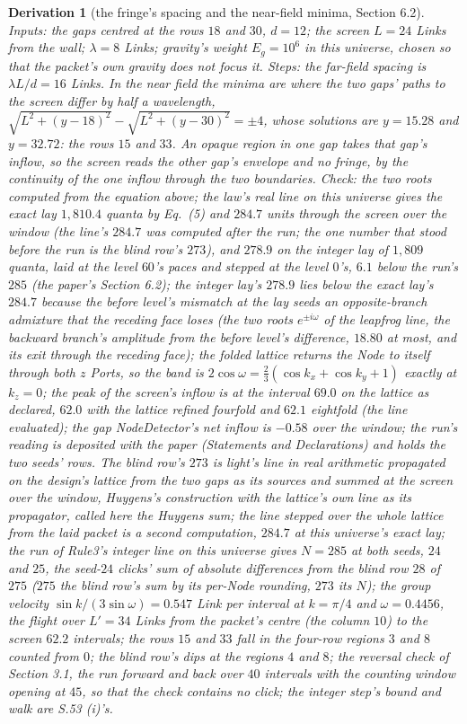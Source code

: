 \documentclass[pdflatex,sn-mathphys-num]{sn-jnl}
\theoremstyle{thmstyleone}
\newtheorem{derivation}{Derivation}
\begin{document}
\begin{derivation}[the fringe's spacing and the near-field minima, Section 6.2]
\emph{Inputs:} the gaps centred at the rows $18$ and $30$, $d = 12$; the screen $L = 24$ Links from the wall; $\lambda = 8$ Links; gravity's weight $E_g = 10^6$ in this universe, chosen so that the packet's own gravity does not focus it. \emph{Steps:} the far-field spacing is $\lambda L / d = 16$ Links. In the near field the minima are where the two gaps' paths to the screen differ by half a wavelength, $\sqrt{L^2 + (y - 18)^2} - \sqrt{L^2 + (y - 30)^2} = \pm 4$, whose solutions are $y = 15.28$ and $y = 32.72$: the rows $15$ and $33$. An opaque region in one gap takes that gap's inflow, so the screen reads the other gap's envelope and no fringe, by the continuity of the one inflow through the two boundaries. \emph{Check:} the two roots computed from the equation above; the law's real line on this universe gives the exact lay $1{,}810.4$ quanta by Eq.~(5) and $284.7$ units through the screen over the window (the line's $284.7$ was computed after the run; the one number that stood before the run is the blind row's $273$), and $278.9$ on the integer lay of $1{,}809$ quanta, laid at the level $60$'s paces and stepped at the level $0$'s, $6.1$ below the run's $285$ (the paper's Section 6.2); the integer lay's $278.9$ lies below the exact lay's $284.7$ because the before level's mismatch at the lay seeds an opposite-branch admixture that the receding face loses (the two roots $e^{\pm i\omega}$ of the leapfrog line, the backward branch's amplitude from the before level's difference, $18.80$ at most, and its exit through the receding face); the folded lattice returns the Node to itself through both $z$ Ports, so the band is $2\cos\omega = \tfrac23(\cos k_x + \cos k_y + 1)$ exactly at $k_z = 0$; the peak of the screen's inflow is at the interval $69.0$ on the lattice as declared, $62.0$ with the lattice refined fourfold and $62.1$ eightfold (the line evaluated); the gap NodeDetector's net inflow is $-0.58$ over the window; the run's reading is deposited with the paper (Statements and Declarations) and holds the two seeds' rows. The blind row's $273$ is light's line in real arithmetic propagated on the design's lattice from the two gaps as its sources and summed at the screen over the window, Huygens's construction with the lattice's own line as its propagator, called here the Huygens sum; the line stepped over the whole lattice from the laid packet is a second computation, $284.7$ at this universe's exact lay; the run of Rule3's integer line on this universe gives $N = 285$ at both seeds, $24$ and $25$, the seed-$24$ clicks' sum of absolute differences from the blind row $28$ of $275$ ($275$ the blind row's sum by its per-Node rounding, $273$ its $N$); the group velocity $\sin k / (3\sin\omega) = 0.547$ Link per interval at $k = \pi / 4$ and $\omega = 0.4456$, the flight over $L' = 34$ Links from the packet's centre (the column $10$) to the screen $62.2$ intervals; the rows $15$ and $33$ fall in the four-row regions $3$ and $8$ counted from $0$; the blind row's dips at the regions $4$ and $8$; the reversal check of Section 3.1, the run forward and back over $40$ intervals with the counting window opening at $45$, so that the check contains no click; the integer step's bound and walk are S.53 (i)'s.

\end{derivation}
\end{document}
